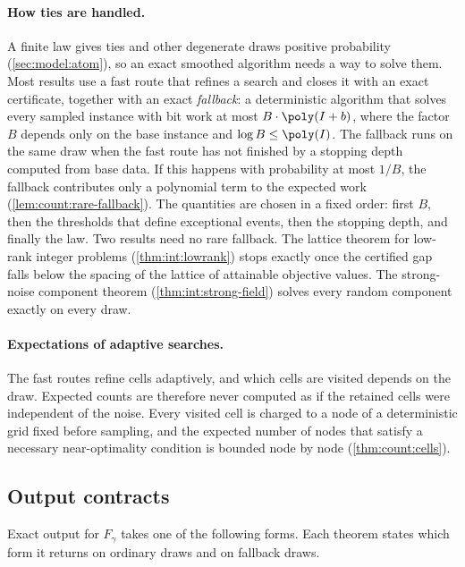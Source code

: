 \paragraph{How ties are handled.}
A finite law gives ties and other degenerate draws positive probability
(\cref{sec:model:atom}), so an exact smoothed algorithm needs a way to
solve them. Most results use a fast route that refines a search and closes
it with an exact certificate, together with an exact \emph{fallback}: a
deterministic algorithm that solves every sampled instance with bit work at
most $B\cdot\poly(I+b)$, where the factor $B$ depends only on the base
instance and $\log B\le\poly(I)$. The fallback runs on the same draw when
the fast route has not finished by a stopping depth computed from base data.
If this happens with probability at most $1/B$, the fallback contributes
only a polynomial term to the expected work
(\cref{lem:count:rare-fallback}). The quantities are chosen in a fixed order:
first $B$, then the thresholds that define exceptional events, then the
stopping depth, and finally the law. Two results need no rare fallback. The
lattice theorem for low-rank integer problems (\cref{thm:int:lowrank}) stops
exactly once the certified gap falls below the spacing of the lattice of
attainable objective values. The strong-noise component theorem
(\cref{thm:int:strong-field}) solves every random component exactly on every
draw.

\paragraph{Expectations of adaptive searches.}
The fast routes refine cells adaptively, and which cells are visited
depends on the draw. Expected counts are therefore never computed as if the
retained cells were independent of the noise. Every visited cell is charged
to a node of a deterministic grid fixed before sampling, and the expected
number of nodes that satisfy a necessary near-optimality condition is
bounded node by node (\cref{thm:count:cells}).

\subsection{Output contracts}\label{sec:model:outputs}

Exact output for $F_\gamma$ takes one of the following forms. Each theorem
states which form it returns on ordinary draws and on fallback draws.

